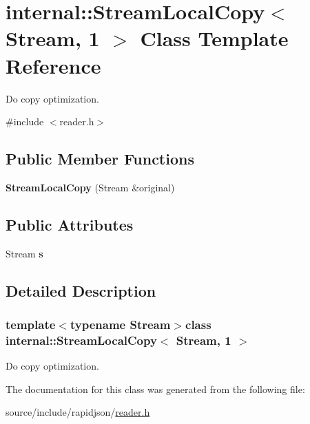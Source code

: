 \hypertarget{classinternal_1_1_stream_local_copy_3_01_stream_00_011_01_4}{}\section{internal\+:\+:Stream\+Local\+Copy$<$ Stream, 1 $>$ Class Template Reference}
\label{classinternal_1_1_stream_local_copy_3_01_stream_00_011_01_4}


Do copy optimization.  




{\ttfamily \#include $<$reader.\+h$>$}

\subsection*{Public Member Functions}
\begin{DoxyCompactItemize}
\item 
\hypertarget{classinternal_1_1_stream_local_copy_3_01_stream_00_011_01_4_aba475fed3eecc9f77ff059fdb7fe2a32}{}{\bfseries Stream\+Local\+Copy} (Stream \&original)\label{classinternal_1_1_stream_local_copy_3_01_stream_00_011_01_4_aba475fed3eecc9f77ff059fdb7fe2a32}

\end{DoxyCompactItemize}
\subsection*{Public Attributes}
\begin{DoxyCompactItemize}
\item 
\hypertarget{classinternal_1_1_stream_local_copy_3_01_stream_00_011_01_4_a1d3e8ae8756325df25715d4ffb9c1b44}{}Stream {\bfseries s}\label{classinternal_1_1_stream_local_copy_3_01_stream_00_011_01_4_a1d3e8ae8756325df25715d4ffb9c1b44}

\end{DoxyCompactItemize}


\subsection{Detailed Description}
\subsubsection*{template$<$typename Stream$>$class internal\+::\+Stream\+Local\+Copy$<$ Stream, 1 $>$}

Do copy optimization. 

The documentation for this class was generated from the following file\+:\begin{DoxyCompactItemize}
\item 
source/include/rapidjson/\hyperlink{reader_8h}{reader.\+h}\end{DoxyCompactItemize}
